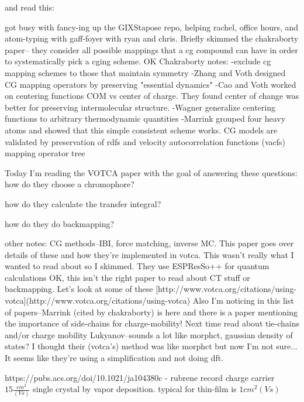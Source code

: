 \documentclass{article}
\begin{document}
and read this: \cite{Chakraborty2018a} 

got busy with fancy-ing up the GIXStapose repo, helping rachel, office hours, and atom-typing with gaff-foyer with ryan and chris. Briefly skimmed the chakraborty paper-- they consider all possible mappings that a cg compound can have in order to systematically pick a cging scheme.
OK Chakraborty notes:
-exclude cg mapping schemes to those that maintain symmetry
-Zhang and Voth designed CG mapping operators by preserving "essential dynamics"
-Cao and Voth worked on centering functions COM vs center of charge. They found center of change was better for preserving intermolecular structure.
-Wagner generalize centering functions to arbitrary thermodynamic quantities
-Marrink grouped four heavy atoms and showed that this simple consistent scheme works.
CG models are validated by preservation of rdfs and velocity autocorrelation functions (vacfs)
mapping operator tree

Today I'm reading the VOTCA\cite{Ruhle2009} paper with the goal of answering these questions:
how do they choose a chromophore?

how do they calculate the transfer integral?

how do they do backmapping?

other notes:
CG methods--IBI, force matching, inverse MC. This paper goes over details of these and how they're implemented in votca. This wasn't really what I wanted to read about so I skimmed.
They use ESPResSo++ for quantum calculations
OK, this isn't the right paper to read about CT stuff or backmapping. Let's look at some of these [http://www.votca.org/citations/using-votca](http://www.votca.org/citations/using-votca)
Also I'm noticing in this list of papers--Marrink (cited by chakraborty) is here and there is a paper mentioning the importance of side-chains for charge-mobility! \cite{May2011}
Next time read about tie-chains \cite{May2011} and/or charge mobility \cite{Lukyanov2010}
Lukyanov--sounds a lot like morphct, gaussian density of states? I thought their (votca's) method was like morphct but now I'm not sure... It seems like they're using a simplification and not doing dft.

https://pubs.acs.org/doi/10.1021/ja104380c - 
rubrene record charge carrier $15 \frac{cm^{2}}{(V s)}$ single crystal by vapor deposition. typical for thin-film is $1 {cm^{2}}{(V s)}$
\end{document}
